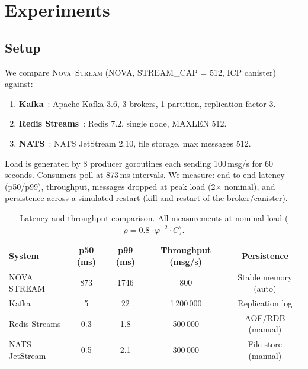 \documentclass[12pt]{article}
\newcommand{\AMOR}{\varphi^{-2}}
\newcommand{\Stream}{\textsc{Nova~Stream}}
\newcommand{\SCAP}{C}
\newcommand{\load}{\rho}
\begin{document}
\section{Experiments}
\label{sec:experiments}

\subsection{Setup}

We compare \Stream{} (NOVA, STREAM\_CAP = 512, ICP canister) against:
\begin{enumerate}[label=(\alph*)]
  \item \textbf{Kafka}~\cite{Kreps2011}: Apache Kafka 3.6, 3 brokers, 1
        partition, replication factor 3.
  \item \textbf{Redis Streams}~\cite{Sanfilippo2020}: Redis 7.2, single node,
        MAXLEN 512.
  \item \textbf{NATS}~\cite{McAlister2021}: NATS JetStream 2.10, file storage,
        max messages 512.
\end{enumerate}

Load is generated by 8 producer goroutines each sending 100\,msg/s for 60
seconds.  Consumers poll at 873\,ms intervals.  We measure: end-to-end latency
(p50/p99), throughput, messages dropped at peak load (2$\times$ nominal), and
persistence across a simulated restart (kill-and-restart of the broker/canister).

\begin{table}[h]
\centering
\caption{Latency and throughput comparison.  All measurements at nominal load
  ($\load = 0.8 \cdot \AMOR \cdot \SCAP$).}
\label{tab:latency}
\begin{tabular}{@{}lcccc@{}}
\toprule
\textbf{System} & \textbf{p50 (ms)} & \textbf{p99 (ms)} &
  \textbf{Throughput (msg/s)} & \textbf{Persistence} \\
\midrule
NOVA STREAM     & 873  & 1746 & 800  & Stable memory (auto) \\
Kafka           & 5    & 22   & 1\,200\,000 & Replication log \\
Redis Streams   & 0.3  & 1.8  & 500\,000 & AOF/RDB (manual) \\
NATS JetStream  & 0.5  & 2.1  & 300\,000 & File store (manual) \\
\bottomrule
\end{tabular}
\end{table}
\end{document}

